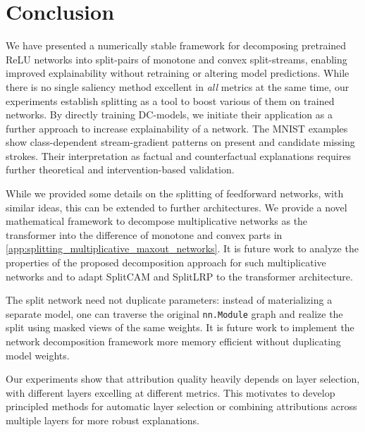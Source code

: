 \section{Conclusion}\label{sec:conclusion}

We have presented a numerically stable framework for decomposing pretrained ReLU networks into split-pairs of monotone and convex split-streams, enabling improved explainability without retraining or altering model predictions.
While there is no single saliency method excellent in \emph{all} metrics at the same time, our experiments establish splitting as a tool to boost various of them on trained networks. 
By directly training DC-models, we initiate their application as a further approach to increase explainability of a network. 
The MNIST examples show class-dependent stream-gradient patterns on present and candidate missing strokes. Their interpretation as factual and counterfactual explanations requires further theoretical and intervention-based validation.

While we provided some details on the splitting of feedforward networks, with similar ideas, this can be extended to further architectures. 
We provide a novel mathematical framework to decompose multiplicative networks as the transformer \citep{Vaswani2017} into the difference of monotone and convex parts in \cref{app:splitting_multiplicative_maxout_networks}.
It is future work to analyze the properties of the proposed decomposition approach for such multiplicative networks and to adapt SplitCAM and SplitLRP to the transformer architecture.

The split network need not duplicate parameters: instead of materializing a separate model, one can traverse the original \texttt{nn.Module} graph and realize the split using masked views of the same weights. It is future work to implement the network decomposition framework more memory efficient without duplicating model weights.

Our experiments show that attribution quality heavily depends on layer selection, with different layers excelling at different metrics. 
This motivates to develop principled methods for automatic layer selection or combining attributions across multiple layers for more robust explanations.
